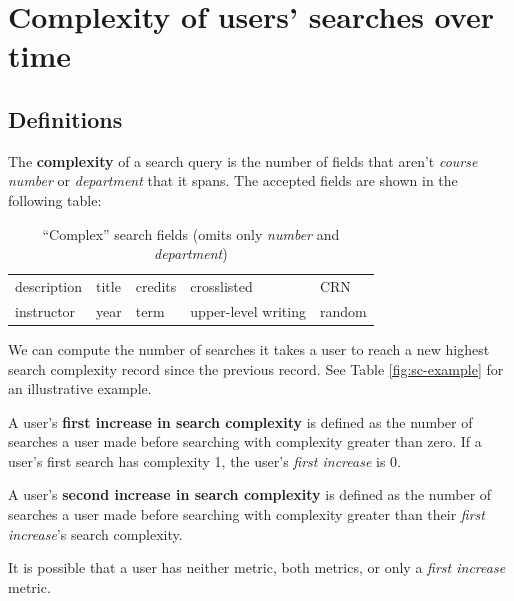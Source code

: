 
\section{Complexity of users' searches over time}

\subsection{Definitions}

The \textbf{complexity} of a search query is the number of fields that aren't \emph{course number} or \emph{department} that it spans. The accepted fields are shown in the following table:

\singlespacing
\begin{center}
\begin{table}[H]
  \centering
  \begin{tabular}{ lllll }

    \hline

    description
    & title
    & credits
    & crosslisted
    & CRN
    \\

    
    instructor
    & year
    & term
    & upper-level writing
    & random
    \\

    \hline

  \end{tabular}
  \vspace{10pt}
  \caption{``Complex'' search fields (omits only \emph{number} and \emph{department})}
  \label{fig:sc-fields}
\end{table}
\end{center}
\doublespacing

\noindent We can compute the number of searches it takes a user to reach a new highest search complexity record since the previous record. See Table \ref{fig:sc-example} for an illustrative example.

A user's \textbf{first increase in search complexity} is defined as the number of searches a user made before searching with complexity greater than zero. If a user's first search has complexity 1, the user's \emph{first increase} is 0.

A user's \textbf{second increase in search complexity} is defined as the number of searches a user made before searching with complexity greater than their \emph{first increase}'s search complexity.

It is possible that a user has neither metric, both metrics, or only a \emph{first increase} metric.

